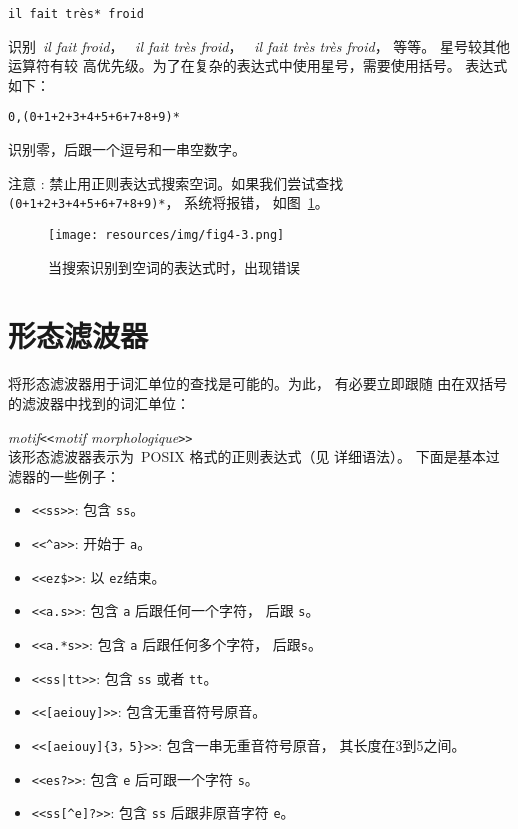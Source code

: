 \begin{verbatim}
il fait très* froid
\end{verbatim}

\noindent 识别\ \textit{il fait froid}， \ \textit{il fait très froid}，
\ \textit{il fait très très froid}， 等等。 星号较其他运算符有较
高优先级。为了在复杂的表达式中使用星号，需要使用括号。 
表达式如下：


\begin{verbatim}
0,(0+1+2+3+4+5+6+7+8+9)*
\end{verbatim}

\noindent 识别零，后跟一个逗号和一串空数字。

\bigskip
\noindent 注意 : 禁止用正则表达式搜索空词。如果我们尝试查找 
\verb$(0+1+2+3+4+5+6+7+8+9)*$， 系统将报错，
如图~\ref{fig-epsilon-error}。


\bigskip
\begin{figure}[h]
\begin{center}
\texttt{[image: resources/img/fig4-3.png]}
\caption{当搜索识别到空词的表达式时，出现错误 \label{fig-epsilon-error}}
\end{center}
\end{figure}


\section{形态滤波器}
\label{section-filters}

将形态滤波器用于词汇单位的查找是可能的。为此， 有必要立即跟随
由在双括号的滤波器中找到的词汇单位：


\bigskip
\noindent
\textit{motif}\verb$<<$\textit{motif morphologique}\verb$>>$ \\


\bigskip{}
\noindent 该形态滤波器表示为\ POSIX 格式的正则表达式（见 \cite{TRE} 详细语法）。 下面是基本过滤器的一些例子：




\begin{itemize}
  \item \verb$<<ss>>$: 包含 \verb$ss$。
  \item \verb$<<^a>>$: 开始于 \verb$a$。
  \item \verb+<<ez$>>+: 以 \verb$ez$结束。
  \item \verb$<<a.s>>$: 包含 \verb$a$ 后跟任何一个字符，  后跟 \verb$s$。
  \item \verb$<<a.*s>>$: 包含 \verb$a$ 后跟任何多个字符， 后跟\verb$s$。
  \item \verb$<<ss|tt>>$: 包含 \verb$ss$ 或者 \verb$tt$。
  \item \verb$<<[aeiouy]>>$: 包含无重音符号原音。
  \item \verb$<<[aeiouy]{3，5}>>$: 包含一串无重音符号原音， 其长度在3到5之间。
  \item \verb$<<es?>>$: 包含 \verb$e$ 后可跟一个字符 \verb$s$。
  \item \verb$<<ss[^e]?>>$: 包含 \verb$ss$ 后跟非原音字符 \verb$e$。
\end{itemize}

